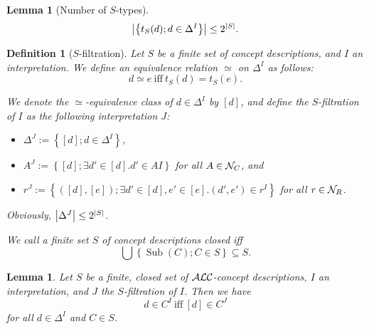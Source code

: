 \documentclass[openany]{scrbook}
\theoremstyle{break}
\newtheorem{Lemma}[Theorem]{Lemma}
\newtheorem{Definition}[Theorem]{Definition}
\theoremstyle{nonumberbreak}
\theoremstyle{nonumberplain}
\theoremstyle{nonumberbreak}
\newcommand{\then}{\Longrightarrow}
\newcommand{\abs}[2][]{\left|{#2}\right|\ifx#1\then\else_{#1}\fi}
\newcommand{\set}[1]{\left\{#1\right\}}
\newcommand{\Sub}{\operatorname{Sub}}
\newcommand{\ALC}{{\cal A}{\cal L}{\cal C}}
\begin{document}
\begin{Lemma}[Number of $S$-types]
  \label{3.14}
  \begin{equation*}
    \abs{\set{t_S(d); d \in \Delta^I}} \leq 2^{\abs{S}}.
  \end{equation*}
\end{Lemma}

\begin{Definition}[$S$-filtration]
  \label{3.15}
  Let $S$ be a finite set of concept descriptions, and $I$ an
  interpretation. We define an equivalence relation $\simeq$ on
  $\Delta^I$ as follows:
  \begin{equation*}
    d \simeq e\ \text{iff}\ t_S(d) = t_S(e).
  \end{equation*}

  We denote the $\simeq$-equivalence class of $d \in \Delta^I$ by
  $[d]$, and define the $S$-filtration of $I$ as the following
  interpretation $J$:
  \begin{itemize}
    \item $\Delta^J := \set{[d]; d \in \Delta^I}$,
    \item $A^J := \set{[d]; \exists d' \in [d]. d' \in AI}$ for all $A
      \in {\cal N}_C$, and
    \item $r^J := \set{([d], [e]); \exists d' \in [d], e' \in
        [e]. (d', e') \in r^I}$ for all $r \in {\cal N}_R$.
  \end{itemize}

  Obviously, $\abs{\Delta^J} \leq 2^{\abs{S}}$.

  We call a finite set $S$ of concept descriptions closed iff
  \begin{equation*}
    \bigcup\set{\Sub(C); C \in S} \subseteq S.
  \end{equation*}
\end{Definition}

\begin{Lemma}
  \label{3.16}
  Let $S$ be a finite, closed set of $\ALC$-concept descriptions, $I$
  an interpretation, and $J$ the $S$-filtration of $I$. Then we have
  \begin{equation*}
    d \in C^I\ \text{iff}\ [d] \in C^J
  \end{equation*}
  for all $d \in \Delta^I$ and $C \in S$.
\end{Lemma}
\end{document}
